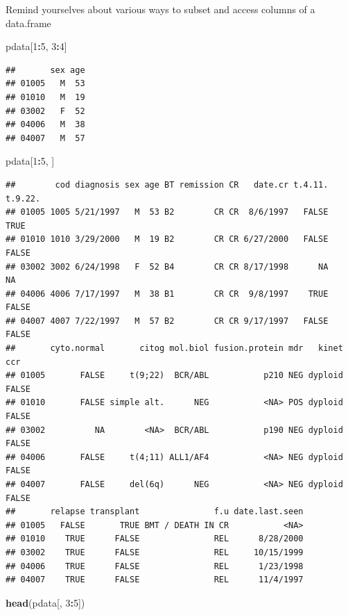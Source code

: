 \documentclass[]{article}
\newenvironment{Shaded}{\begin{snugshade}}{\end{snugshade}}
\newcommand{\KeywordTok}[1]{\textcolor[rgb]{0.13,0.29,0.53}{\textbf{#1}}}
\newcommand{\DecValTok}[1]{\textcolor[rgb]{0.00,0.00,0.81}{#1}}
\newcommand{\OperatorTok}[1]{\textcolor[rgb]{0.81,0.36,0.00}{\textbf{#1}}}
\newcommand{\NormalTok}[1]{#1}
\theoremstyle{definition}
\theoremstyle{definition}
\theoremstyle{remark}
\begin{document}
Remind yourselves about various ways to subset and access columns of a
data.frame

\begin{Shaded}
\begin{Highlighting}[]
\NormalTok{pdata[}\DecValTok{1}\OperatorTok{:}\DecValTok{5}\NormalTok{, }\DecValTok{3}\OperatorTok{:}\DecValTok{4}\NormalTok{]}
\end{Highlighting}
\end{Shaded}

\begin{verbatim}
##       sex age
## 01005   M  53
## 01010   M  19
## 03002   F  52
## 04006   M  38
## 04007   M  57
\end{verbatim}

\begin{Shaded}
\begin{Highlighting}[]
\NormalTok{pdata[}\DecValTok{1}\OperatorTok{:}\DecValTok{5}\NormalTok{, ]}
\end{Highlighting}
\end{Shaded}

\begin{verbatim}
##        cod diagnosis sex age BT remission CR   date.cr t.4.11. t.9.22.
## 01005 1005 5/21/1997   M  53 B2        CR CR  8/6/1997   FALSE    TRUE
## 01010 1010 3/29/2000   M  19 B2        CR CR 6/27/2000   FALSE   FALSE
## 03002 3002 6/24/1998   F  52 B4        CR CR 8/17/1998      NA      NA
## 04006 4006 7/17/1997   M  38 B1        CR CR  9/8/1997    TRUE   FALSE
## 04007 4007 7/22/1997   M  57 B2        CR CR 9/17/1997   FALSE   FALSE
##       cyto.normal       citog mol.biol fusion.protein mdr   kinet   ccr
## 01005       FALSE     t(9;22)  BCR/ABL           p210 NEG dyploid FALSE
## 01010       FALSE simple alt.      NEG           <NA> POS dyploid FALSE
## 03002          NA        <NA>  BCR/ABL           p190 NEG dyploid FALSE
## 04006       FALSE     t(4;11) ALL1/AF4           <NA> NEG dyploid FALSE
## 04007       FALSE     del(6q)      NEG           <NA> NEG dyploid FALSE
##       relapse transplant               f.u date.last.seen
## 01005   FALSE       TRUE BMT / DEATH IN CR           <NA>
## 01010    TRUE      FALSE               REL      8/28/2000
## 03002    TRUE      FALSE               REL     10/15/1999
## 04006    TRUE      FALSE               REL      1/23/1998
## 04007    TRUE      FALSE               REL      11/4/1997
\end{verbatim}

\begin{Shaded}
\begin{Highlighting}[]
\KeywordTok{head}\NormalTok{(pdata[, }\DecValTok{3}\OperatorTok{:}\DecValTok{5}\NormalTok{])}
\end{Highlighting}
\end{Shaded}
\end{document}
